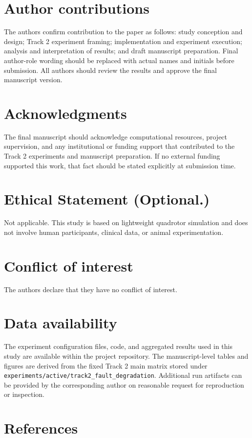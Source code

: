 \documentclass[12pt,a4paper]{article}
\begin{document}
\section{Author contributions}

The authors confirm contribution to the paper as follows: study conception and design; Track 2 experiment framing; implementation and experiment execution; analysis and interpretation of results; and draft manuscript preparation. Final author-role wording should be replaced with actual names and initials before submission. All authors should review the results and approve the final manuscript version.

\section{Acknowledgments}

The final manuscript should acknowledge computational resources, project supervision, and any institutional or funding support that contributed to the Track 2 experiments and manuscript preparation. If no external funding supported this work, that fact should be stated explicitly at submission time.

\section{Ethical Statement (Optional.)}

Not applicable. This study is based on lightweight quadrotor simulation and does not involve human participants, clinical data, or animal experimentation.

\section{Conflict of interest}

The authors declare that they have no conflict of interest.

\section{Data availability}

The experiment configuration files, code, and aggregated results used in this study are available within the project repository. The manuscript-level tables and figures are derived from the fixed Track 2 main matrix stored under \texttt{experiments/active/track2\_fault\_degradation}. Additional run artifacts can be provided by the corresponding author on reasonable request for reproduction or inspection.

\section{References}



\end{document}
